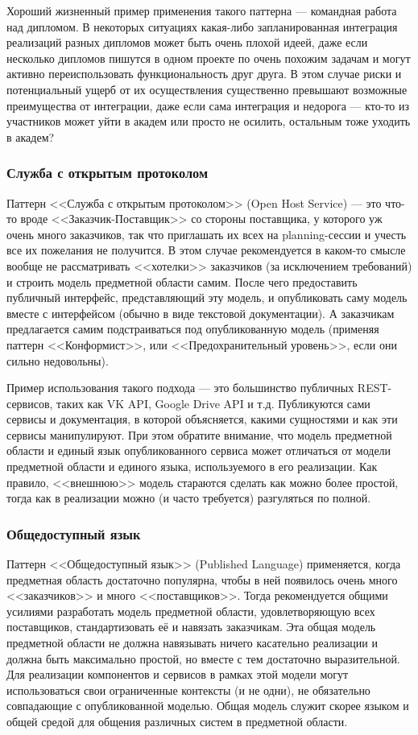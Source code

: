 \documentclass[a5paper]{article}
\begin{document}
Хороший жизненный пример применения такого паттерна --- командная работа над дипломом. В некоторых ситуациях какая-либо запланированная интеграция реализаций разных дипломов может быть очень плохой идеей, даже если несколько дипломов пишутся в одном проекте по очень похожим задачам и могут активно переиспользовать функциональность друг друга. В этом случае риски и потенциальный ущерб от их осуществления существенно превышают возможные преимущества от интеграции, даже если сама интеграция и недорога --- кто-то из участников может уйти в академ или просто не осилить, остальным тоже уходить в академ?

\subsubsection{Служба с открытым протоколом}

Паттерн <<Служба с открытым протоколом>> (Open Host Service) --- это что-то вроде <<Заказчик-Поставщик>> со стороны поставщика, у которого уж очень много заказчиков, так что приглашать их всех на planning-сессии и учесть все их пожелания не получится. В этом случае рекомендуется в каком-то смысле вообще не рассматривать <<хотелки>> заказчиков (за исключением требований) и строить модель предметной области самим. После чего предоставить публичный интерфейс, представляющий эту модель, и опубликовать саму модель вместе с интерфейсом (обычно в виде текстовой документации). А заказчикам предлагается самим подстраиваться под опубликованную модель (применяя паттерн <<Конформист>>, или <<Предохранительный уровень>>, если они сильно недовольны).

Пример использования такого подхода --- это большинство публичных REST-сервисов, таких как VK API, Google Drive API и т.д. Публикуются сами сервисы и документация, в которой объясняется, какими сущностями и как эти сервисы манипулируют. При этом обратите внимание, что модель предметной области и единый язык опубликованного сервиса может отличаться от модели предметной области и единого языка, используемого в его реализации. Как правило, <<внешнюю>> модель стараются сделать как можно более простой, тогда как в реализации можно (и часто требуется) разгуляться по полной.

\subsubsection{Общедоступный язык}

Паттерн <<Общедоступный язык>> (Published Language) применяется, когда предметная область достаточно популярна, чтобы в ней появилось очень много <<заказчиков>> и много <<поставщиков>>. Тогда рекомендуется общими усилиями разработать модель предметной области, удовлетворяющую всех поставщиков, стандартизовать её и навязать заказчикам. Эта общая модель предметной области не должна навязывать ничего касательно реализации и должна быть максимально простой, но вместе с тем достаточно выразительной. Для реализации компонентов и сервисов в рамках этой модели могут использоваться свои ограниченные контексты (и не одни), не обязательно совпадающие с опубликованной моделью. Общая модель служит скорее языком и общей средой для общения различных систем в предметной области. 
\end{document}
